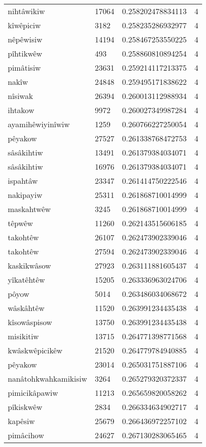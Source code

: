 \begin{longtable}{llll}
nihtâwikiw & 17064 & 0.258202478834113 & 4 \\
kîwêpiciw & 3182 & 0.258235286932977 & 4 \\
nêpêwisiw & 14194 & 0.258467253550225 & 4 \\
pîhtikwêw & 493 & 0.258860810894254 & 4 \\
pimâtisiw & 23631 & 0.259214117213375 & 4 \\
nakîw & 24848 & 0.259495171838622 & 4 \\
nîsiwak & 26394 & 0.260013112988934 & 4 \\
ihtakow & 9972 & 0.260027349987284 & 4 \\
ayamihêwiyinîwiw & 1259 & 0.260766227250054 & 4 \\
pêyakow & 27527 & 0.261338768472753 & 4 \\
sâsâkihtiw & 13491 & 0.261379384034071 & 4 \\
sâsâkihtiw & 16976 & 0.261379384034071 & 4 \\
ispahtâw & 23347 & 0.261414750222546 & 4 \\
nakipayiw & 25311 & 0.261868710014999 & 4 \\
maskahtwêw & 3245 & 0.261868710014999 & 4 \\
têpwêw & 11260 & 0.262143515606185 & 4 \\
takohtêw & 26107 & 0.262473902339046 & 4 \\
takohtêw & 27594 & 0.262473902339046 & 4 \\
kaskikwâsow & 27923 & 0.263111881605437 & 4 \\
yîkatêhtêw & 15205 & 0.263336963024706 & 4 \\
pôyow & 5014 & 0.263486034068672 & 4 \\
wâskâhtêw & 11520 & 0.263991234435438 & 4 \\
kîsowâspisow & 13750 & 0.263991234435438 & 4 \\
misikitiw & 13715 & 0.264771398771568 & 4 \\
kwâskwêpicikêw & 21520 & 0.264779784940885 & 4 \\
pêyakow & 23014 & 0.265031751887106 & 4 \\
nanâtohkwahkamikisiw & 3264 & 0.265279320372337 & 4 \\
pimicikâpawiw & 11213 & 0.265659820058262 & 4 \\
pîkiskwêw & 2834 & 0.266334634902717 & 4 \\
kapêsiw & 25679 & 0.266436972257102 & 4 \\
pimâcihow & 24627 & 0.267130283065465 & 4 \\

\end{longtable}
